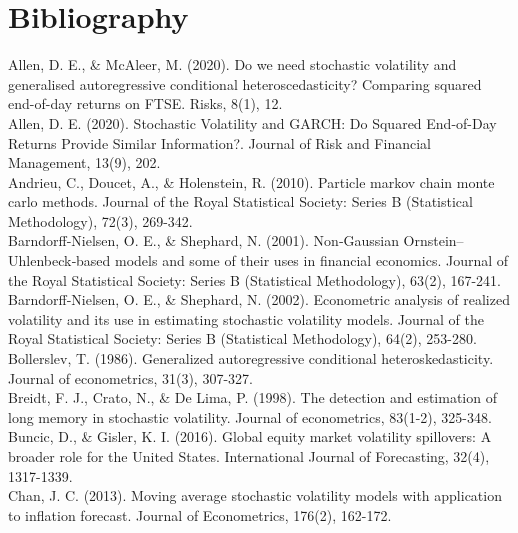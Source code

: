 \documentclass[
]{book}
\theoremstyle{break}
\theoremstyle{nonumberplain}
\begin{document}
\section{Bibliography}

\hfill\break

Allen, D. E., \& McAleer, M. (2020). Do we need stochastic volatility
and generalised autoregressive conditional heteroscedasticity? Comparing
squared end-of-day returns on FTSE. Risks, 8(1), 12.\\

Allen, D. E. (2020). Stochastic Volatility and GARCH: Do Squared
End-of-Day Returns Provide Similar Information?. Journal of Risk and
Financial Management, 13(9), 202.\\

Andrieu, C., Doucet, A., \& Holenstein, R. (2010). Particle markov chain
monte carlo methods. Journal of the Royal Statistical Society: Series B
(Statistical Methodology), 72(3), 269-342.\\

Barndorff‐Nielsen, O. E., \& Shephard, N. (2001). Non‐Gaussian
Ornstein--Uhlenbeck‐based models and some of their uses in financial
economics. Journal of the Royal Statistical Society: Series B
(Statistical Methodology), 63(2), 167-241.\\

Barndorff‐Nielsen, O. E., \& Shephard, N. (2002). Econometric analysis
of realized volatility and its use in estimating stochastic volatility
models. Journal of the Royal Statistical Society: Series B (Statistical
Methodology), 64(2), 253-280.\\

Bollerslev, T. (1986). Generalized autoregressive conditional
heteroskedasticity. Journal of econometrics, 31(3), 307-327.\\

Breidt, F. J., Crato, N., \& De Lima, P. (1998). The detection and
estimation of long memory in stochastic volatility. Journal of
econometrics, 83(1-2), 325-348.\\

Buncic, D., \& Gisler, K. I. (2016). Global equity market volatility
spillovers: A broader role for the United States. International Journal
of Forecasting, 32(4), 1317-1339.\\

Chan, J. C. (2013). Moving average stochastic volatility models with
application to inflation forecast. Journal of Econometrics, 176(2),
162-172.\\
\end{document}
